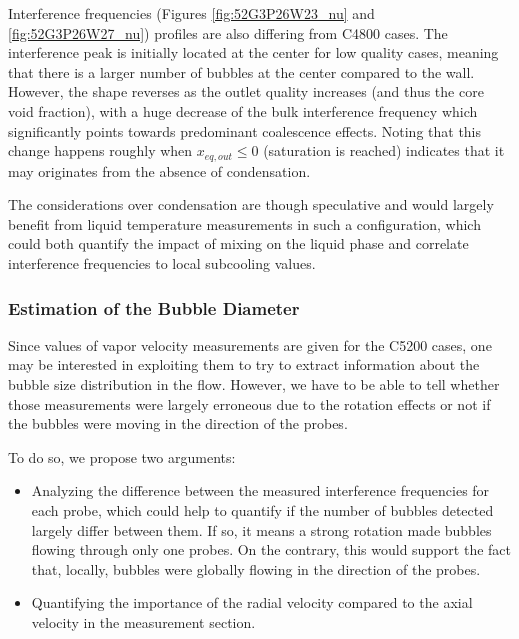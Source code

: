 \npar

Interference frequencies (Figures \ref{fig:52G3P26W23_nu} and \ref{fig:52G3P26W27_nu}) profiles are also differing from C4800 cases. The interference peak is initially located at the center for low quality cases, meaning that there is a larger number of bubbles at the center compared to the wall. However, the shape reverses as the outlet quality increases (and thus the core void fraction), with a huge decrease of the bulk interference frequency which significantly points towards predominant coalescence effects. Noting that this change happens roughly when $x_{eq,out} \leq 0$ (saturation is reached) indicates that it may originates from the absence of condensation.   

\begin{remark*}{}
The considerations over condensation are though speculative and would largely benefit from liquid temperature measurements in such a configuration, which could both quantify the impact of mixing on the liquid phase and correlate interference frequencies to local subcooling values.
\end{remark*}


\subsubsection{Estimation of the Bubble Diameter}

Since values of vapor velocity measurements are given for the C5200 cases, one may be interested in exploiting them to try to extract information about the bubble size distribution in the flow. However, we have to be able to tell whether those measurements were largely erroneous due to the rotation effects or not \ie if the bubbles were moving in the direction of the probes.

\npar

To do so, we propose two arguments:

\begin{itemize}
\item Analyzing the difference between the measured interference frequencies for each probe, which could help to quantify if the number of bubbles detected largely differ between them. If so, it means a strong rotation made bubbles flowing through only one probes. On the contrary, this would support the fact that, locally, bubbles were globally flowing in the direction of the probes.

\item Quantifying the importance of the radial velocity compared to the axial velocity in the measurement section.
\end{itemize}


